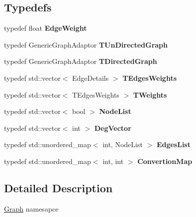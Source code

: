 \subsection*{Typedefs}
\begin{DoxyCompactItemize}
\item 
\hypertarget{namespaceall__distance__sketch_1_1graph_a2d175db5da8d4d16b4ca78fdf5bb5030}{}typedef float {\bfseries Edge\+Weight}\label{namespaceall__distance__sketch_1_1graph_a2d175db5da8d4d16b4ca78fdf5bb5030}

\item 
\hypertarget{namespaceall__distance__sketch_1_1graph_af901d90caf33bca87b442ba6f3a9456a}{}typedef Generic\+Graph\+Adaptor {\bfseries T\+Un\+Directed\+Graph}\label{namespaceall__distance__sketch_1_1graph_af901d90caf33bca87b442ba6f3a9456a}

\item 
\hypertarget{namespaceall__distance__sketch_1_1graph_a5cc6815b98d71e5f230b997182b77706}{}typedef Generic\+Graph\+Adaptor {\bfseries T\+Directed\+Graph}\label{namespaceall__distance__sketch_1_1graph_a5cc6815b98d71e5f230b997182b77706}

\item 
\hypertarget{namespaceall__distance__sketch_1_1graph_a95ef0338b7fed0aff4bbde5ede822bb9}{}typedef std\+::vector$<$ Edge\+Details $>$ {\bfseries T\+Edges\+Weights}\label{namespaceall__distance__sketch_1_1graph_a95ef0338b7fed0aff4bbde5ede822bb9}

\item 
\hypertarget{namespaceall__distance__sketch_1_1graph_ae3fe05f01cffe65e19901f4b1a81d648}{}typedef std\+::vector$<$ T\+Edges\+Weights $>$ {\bfseries T\+Weights}\label{namespaceall__distance__sketch_1_1graph_ae3fe05f01cffe65e19901f4b1a81d648}

\item 
\hypertarget{namespaceall__distance__sketch_1_1graph_a8e94ef179a2bb1b532bdbc0bc8448470}{}typedef std\+::vector$<$ bool $>$ {\bfseries Node\+List}\label{namespaceall__distance__sketch_1_1graph_a8e94ef179a2bb1b532bdbc0bc8448470}

\item 
\hypertarget{namespaceall__distance__sketch_1_1graph_af73ad8224461e1b433ab10b845da6650}{}typedef std\+::vector$<$ int $>$ {\bfseries Deg\+Vector}\label{namespaceall__distance__sketch_1_1graph_af73ad8224461e1b433ab10b845da6650}

\item 
\hypertarget{namespaceall__distance__sketch_1_1graph_aeb7544646e3303c0145c1f4239b5dad8}{}typedef std\+::unordered\+\_\+map$<$ int, Node\+List $>$ {\bfseries Edges\+List}\label{namespaceall__distance__sketch_1_1graph_aeb7544646e3303c0145c1f4239b5dad8}

\item 
\hypertarget{namespaceall__distance__sketch_1_1graph_a3fd4b182f552ab8193b4035081b12f44}{}typedef std\+::unordered\+\_\+map$<$ int, int $>$ {\bfseries Convertion\+Map}\label{namespaceall__distance__sketch_1_1graph_a3fd4b182f552ab8193b4035081b12f44}

\end{DoxyCompactItemize}


\subsection{Detailed Description}
\hyperlink{classall__distance__sketch_1_1graph_1_1Graph}{Graph} namesapce 